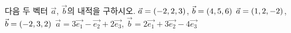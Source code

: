 다음 두 벡터 $\vec{a}$, $\vec{b}$의 내적을 구하시오.
 $\vec{a}=(-2{,}\mkern3mu\mathopen{}2{,}\mkern3mu\mathopen{}3)$, $\vec{b}=(4{,}\mkern3mu\mathopen{}5{,}\mkern3mu\mathopen{}6)$
 $\vec{a}=(1{,}\mkern3mu\mathopen{}2{,}\mkern3mu\mathopen{}-2)$, $\vec{b}=(-2{,}\mkern3mu\mathopen{}3{,}\mkern3mu\mathopen{}2)$
 $\vec{a}=3\vec{e_1}-\vec{e_2}+2\vec{e_3}$, $\vec{b}=2\vec{e_1}+3\vec{e_2}-4\vec{e_3}$ 
